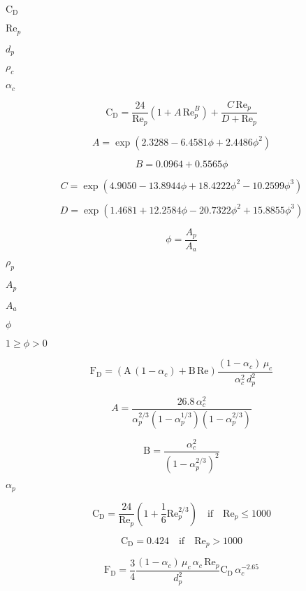 \documentclass{article}
\begin{document}
$        \mathrm{C}_\mathrm{D} $
\pagebreak

$        \mathrm{Re}_p         $
\pagebreak

$        d_p                   $
\pagebreak

$        \rho_c   $
\pagebreak

$        \alpha_c              $
\pagebreak

\[
    \mathrm{C}_\mathrm{D} =
        \frac{24}{\mathrm{Re}_p} \left( 1 + A \, \mathrm{Re}_p^B \right)
      + \frac{C \, \mathrm{Re}_p}{D + \mathrm{Re}_p}
\]
\pagebreak

\[
    A = \exp(2.3288 - 6.4581\phi + 2.4486 \phi^2)
\]
\pagebreak

\[
    B = 0.0964 + 0.5565\phi
\]
\pagebreak

\[
    C = \exp(4.9050 - 13.8944\phi + 18.4222\phi^2 - 10.2599 \phi^3)
\]
\pagebreak

\[
    D = \exp(1.4681 + 12.2584\phi - 20.7322\phi^2 + 15.8855\phi^3)
\]
\pagebreak

\[
    \phi = \frac{A_p}{A_a}
\]
\pagebreak

$        \rho_p                $
\pagebreak

$        A_p        $
\pagebreak

$        A_a           $
\pagebreak

$        \phi          $
\pagebreak

$ 1 \geq \phi > 0 $
\pagebreak

\[
    \mathrm{F}_\mathrm{D} =
        \left(\mathrm{A}\, (1-\alpha_c) + \mathrm{B}\, \mathrm{Re}\right)
        \frac{(1-\alpha_c)\, \mu_c}{\alpha_c^2\, d_p^2}
\]
\pagebreak

\[
    A = \frac{26.8\, \alpha_c^2}
    {
        \alpha_p^{2/3}
        (1 - \alpha_p^{1/3})
        (1 - \alpha_p^{2/3})
    }
\]
\pagebreak

\[
    \mathrm{B} = \frac{\alpha_c^2}{\left( 1 - \alpha_p^{2/3} \right)^2}
\]
\pagebreak

$        \alpha_p              $
\pagebreak

\[
    \mathrm{C}_\mathrm{D} =
        \frac{24}{\mathrm{Re}_p}
        \left(1 + \frac{1}{6}\mathrm{Re}_p^{2/3} \right)
        \quad \mathrm{if} \quad \mathrm{Re}_p \leq 1000
\]
\pagebreak

\[
    \mathrm{C}_\mathrm{D} =
        0.424 \quad \mathrm{if} \quad \mathrm{Re}_p > 1000
\]
\pagebreak

\[
    \mathrm{F}_\mathrm{D} =
        \frac{3}{4}
        \frac{(1 - \alpha_c) \, \mu_c \, \alpha_c \, \mathrm{Re}_p }{d_p^2}
        \mathrm{C}_\mathrm{D} \, \alpha_c^{-2.65}
\]
\pagebreak
\end{document}
